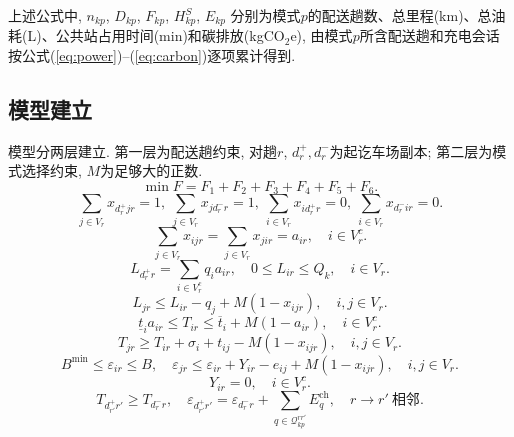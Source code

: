 \documentclass{setp-new}
\begin{document}
上述公式中, $n_{kp}$, $D_{kp}$, $F_{kp}$, $H_{kp}^{S}$, $E_{kp}$
分别为模式$p$的配送趟数、总里程(km)、总油耗(L)、公共站占用时间(min)和碳排放(kgCO$_2$e),
由模式$p$所含配送趟和充电会话按公式(\ref{eq:power})--(\ref{eq:carbon})逐项累计得到.

\subsection{模型建立}

模型分两层建立. 第一层为配送趟约束, 对趟$r$, $d_r^+,d_r^-$为起讫车场副本; 第二层为模式选择约束, $M$为足够大的正数.
\begin{equation}
\min F=F_1+F_2+F_3+F_4+F_5+F_6. \label{eq:obj}
\end{equation}
\begin{equation}
\sum_{j\in V_r}x_{d_r^+jr}=1,\ \sum_{j\in V_r}x_{jd_r^-r}=1,\ \sum_{i\in V_r}x_{id_r^+r}=0,\ \sum_{i\in V_r}x_{d_r^-ir}=0.
\label{eq:trip_flow}
\end{equation}
\begin{equation}
\sum_{j\in V_r}x_{ijr}=\sum_{j\in V_r}x_{jir}=a_{ir},\quad i\in V_r^c.
\label{eq:flow_cons}
\end{equation}
\begin{equation}
L_{d_r^+r}=\sum_{i\in V_r^c}q_i a_{ir},\quad 0\le L_{ir}\le Q_k,\quad i\in V_r.
\label{eq:load_bounds}
\end{equation}
\begin{equation}
L_{jr}\le L_{ir}-q_j+M(1-x_{ijr}),\quad i,j\in V_r.
\label{eq:load_prop}
\end{equation}
\begin{equation}
\underline t_i a_{ir}\le T_{ir}\le\overline t_i+M(1-a_{ir}),\quad i\in V_r^c.
\label{eq:tw}
\end{equation}
\begin{equation}
T_{jr}\ge T_{ir}+\sigma_i+t_{ij}-M(1-x_{ijr}),\quad i,j\in V_r.
\label{eq:time_prop}
\end{equation}
\begin{equation}
B^{\min}\le\varepsilon_{ir}\le B,\quad
\varepsilon_{jr}\le\varepsilon_{ir}+Y_{ir}-e_{ij}+M(1-x_{ijr}),\quad i,j\in V_r.
\label{eq:batt_prop}
\end{equation}
\begin{equation}
Y_{ir}=0,\quad i\in V_r^c.
\label{eq:no_customer_charge}
\end{equation}
\begin{equation}
T_{d_{r'}^+r'}\ge T_{d_r^-r},\quad
\varepsilon_{d_{r'}^+r'}=\varepsilon_{d_r^-r}+\sum_{q\in\mathcal Q_{kp}^{rr'}}E_q^{\mathrm{ch}},\quad r\to r'\ \text{相邻}.
\label{eq:trip_linkage}
\end{equation}
\end{document}
